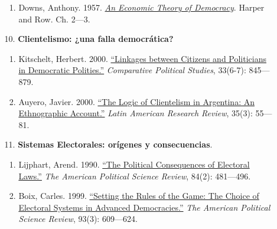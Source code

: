 \documentclass[letterpaper]{article}
\begin{document}
\begin{enumerate}
\begin{enumerate}
\begin{enumerate}
						\item Downs, Anthony. 1957. \href{https://github.com/hbahamonde/Ciencia_Politica_I/raw/master/Readings/Downs.pdf}{\emph{An Economic Theory of Democracy}}. Harper and Row. Ch. 2---3.
					\end{enumerate}
			
				\item[10.] {\bf Clientelismo: ¿una falla democr\'atica?} 
					\begin{enumerate}
						\item Kitschelt, Herbert. 2000. \href{https://github.com/hbahamonde/Ciencia_Politica_I/raw/master/Readings/Kitschelt.pdf}{``Linkages between Citizens and Politicians in Democratic Polities.''} \emph{Comparative Political Studies}, 33(6-7): 845---879.
					
						\item Auyero, Javier. 2000. \href{https://github.com/hbahamonde/Ciencia_Politica_I/raw/master/Readings/Auyero.pdf}{``The Logic of Clientelism in Argentina: An Ethnographic Account.''} \emph{Latin American Research Review}, 35(3): 55---81.
					\end{enumerate}
				
				\item[11.] {\bf Sistemas Electorales: or\'igenes y consecuencias}.
					\begin{enumerate}
						\item Lijphart, Arend. 1990. \href{https://github.com/hbahamonde/Ciencia_Politica_I/raw/master/Readings/Lijphart_1990.pdf}{``The Political Consequences of Electoral Laws.''} \emph{The American Political Science Review}, 84(2): 481---496.

						\item Boix, Carles. 1999. \href{https://github.com/hbahamonde/Ciencia_Politica_I/raw/master/Readings/Boix.pdf}{``Setting the Rules of the Game: The Choice of Electoral Systems in Advanced Democracies.''} \emph{The American Political Science Review}, 93(3): 609---624. 
									

\end{enumerate}
\end{enumerate}
\end{enumerate}
\end{document}
